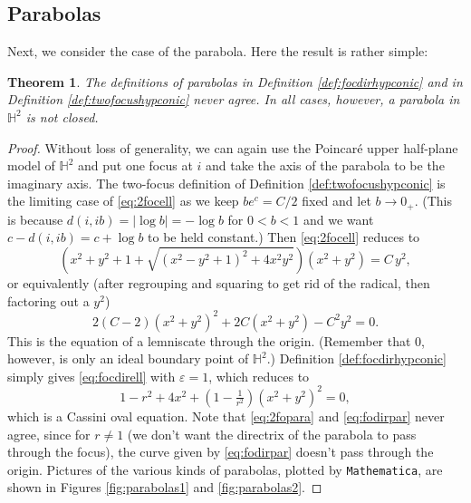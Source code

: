 \documentclass[12pt]{amsart}
\newtheorem{theorem}{Theorem}
\theoremstyle{definition}
\begin{document}
\subsection{Parabolas}
\label{sec:parabola}
Next, we consider the case of the parabola. Here the result is rather simple:
\begin{theorem}
\label{thm:parabolas}
The definitions of parabolas in Definition \ref{def:focdirhypconic}
and  in Definition \ref{def:twofocushypconic}
never agree.  In all cases, however, a parabola in ${\mathbb H}^2$ is not
closed.
\end{theorem}
\begin{proof}
Without loss of generality, we can again use the Poincar\'e upper
half-plane model of ${\mathbb H}^2$ and put one focus at $i$ and take
the axis of the parabola to be the imaginary axis.  The two-focus 
definition of  Definition \ref{def:twofocushypconic} is the limiting 
case of \eqref{eq:2focell} as we keep $be^c = C/2$ fixed and 
let $b\to 0_+$.  (This is because $d(i,ib)=\vert\log b\vert = - \log b$ 
for $0<b<1$ and we want $c-d(i,ib)= c + \log b$ to be held constant.)  
Then \eqref{eq:2focell} reduces to 
\begin{equation}
\label{eq:2fopar}
\left(x^2+y^2+1+\sqrt{(x^2 - y^2 + 1)^2 + 4 x^2 y^2}\right)
\left(x^2+y^2\right) = C\,y^2,
\end{equation}
or equivalently (after regrouping and squaring to get rid of the radical, 
then factoring out a $y^2$)
\begin{equation}
\label{eq:2fopara}
2(C - 2)(x^2 + y^2)^2  + 2C(x^2 + y^2) - C^2 y^2 =0 .
\end{equation}
This is the equation of a lemniscate through the origin.  (Remember 
that $0$, however, is only an ideal boundary point of ${\mathbb H}^2$.)  
Definition \ref{def:focdirhypconic} simply gives \eqref{eq:focdirell} 
with $\varepsilon = 1$, which reduces to
\begin{equation}
\label{eq:fodirpar}
1 - r^2 + 4 x^2 + \left(1 - \tfrac{1}{r^2}\right) (x^2 + y^2)^2 = 0  ,
\end{equation}
which is a Cassini oval equation.  Note that \eqref{eq:2fopara} and 
\eqref{eq:fodirpar} never agree, since for $r\ne 1$ (we don't want 
the directrix of the parabola to pass through the focus), the curve 
given by \eqref{eq:fodirpar} doesn't pass through the origin. Pictures 
of the various kinds of parabolas, plotted by \texttt{Mathematica}, 
are shown in Figures \ref{fig:parabolas1} and \ref{fig:parabolas2}.
\end{proof}
\end{document}
